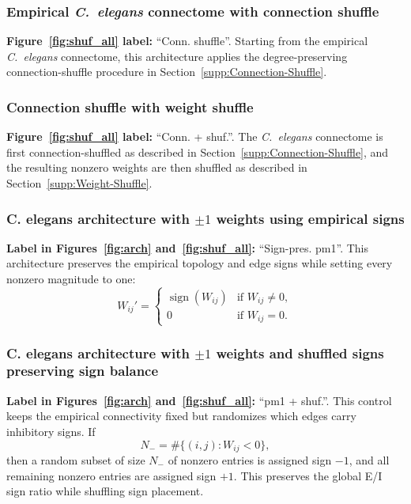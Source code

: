 \documentclass[a4paper,fleqn]{style_neural_networks/cas-dc}
\begin{document}
\subsubsection{Empirical \textit{C.\ elegans} connectome with connection shuffle}
\label{sec:original_connection_shuffle}
\noindent\textbf{Figure~\ref{fig:shuf_all} label:} \enquote{Conn. shuffle}.
Starting from the empirical \textit{C.\ elegans} connectome, this architecture applies the degree-preserving connection-shuffle procedure in Section~\ref{supp:Connection-Shuffle}.

\subsubsection{Connection shuffle with weight shuffle}
\noindent\textbf{Figure~\ref{fig:shuf_all} label:} \enquote{Conn. + shuf.}.
The \textit{C.\ elegans} connectome is first connection-shuffled as described in Section~\ref{supp:Connection-Shuffle}, and the resulting nonzero weights are then shuffled as described in Section~\ref{supp:Weight-Shuffle}.

\subsubsection[C. elegans architecture with signed unit weights using empirical signs]{C. elegans architecture with $\pm 1$ weights using empirical signs}
\label{sec:plus1minus1network}
\noindent\textbf{Label in Figures~\ref{fig:arch} and~\ref{fig:shuf_all}:} \enquote{Sign-pres. pm1}.
This architecture preserves the empirical topology and edge signs while setting every nonzero magnitude to one:
\[
W_{ij}' =
\begin{cases}
\operatorname{sign}(W_{ij}) & \text{if } W_{ij} \neq 0,\\
0 & \text{if } W_{ij} = 0.
\end{cases}
\]

\subsubsection[C. elegans architecture with signed unit weights and shuffled signs preserving sign balance]{C. elegans architecture with $\pm 1$ weights and shuffled signs preserving sign balance}
\noindent\textbf{Label in Figures~\ref{fig:arch} and~\ref{fig:shuf_all}:} \enquote{pm1 + shuf.}.
This control keeps the empirical connectivity fixed but randomizes which edges carry inhibitory signs. If
\[
N_-=\#\{(i,j):W_{ij}<0\},
\]
then a random subset of size \(N_-\) of nonzero entries is assigned sign \(-1\), and all remaining nonzero entries are assigned sign \(+1\). This preserves the global E/I sign ratio while shuffling sign placement.
\end{document}
